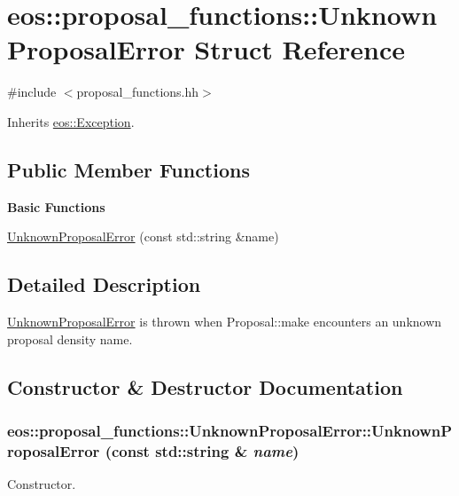 \hypertarget{structeos_1_1proposal__functions_1_1UnknownProposalError}{
\section{eos::proposal\_\-functions::UnknownProposalError Struct Reference}
\label{structeos_1_1proposal__functions_1_1UnknownProposalError}
}


{\ttfamily \#include $<$proposal\_\-functions.hh$>$}

Inherits \hyperlink{classeos_1_1Exception}{eos::Exception}.\subsection*{Public Member Functions}
\begin{Indent}{\bf Basic Functions}\par
{\em \label{_amgrp2386c9a1f1785edee33f374dd2db9b3d}
 }\begin{DoxyCompactItemize}
\item 
\hyperlink{structeos_1_1proposal__functions_1_1UnknownProposalError_a65a9b64434c640d260f819e36ac1be2d}{UnknownProposalError} (const std::string \&name)
\end{DoxyCompactItemize}
\end{Indent}


\subsection{Detailed Description}
\hyperlink{structeos_1_1proposal__functions_1_1UnknownProposalError}{UnknownProposalError} is thrown when Proposal::make encounters an unknown proposal density name. 

\subsection{Constructor \& Destructor Documentation}
\hypertarget{structeos_1_1proposal__functions_1_1UnknownProposalError_a65a9b64434c640d260f819e36ac1be2d}{
\subsubsection[{UnknownProposalError}]{\setlength{\rightskip}{0pt plus 5cm}eos::proposal\_\-functions::UnknownProposalError::UnknownProposalError (const std::string \& {\em name})}}
\label{structeos_1_1proposal__functions_1_1UnknownProposalError_a65a9b64434c640d260f819e36ac1be2d}
Constructor.


